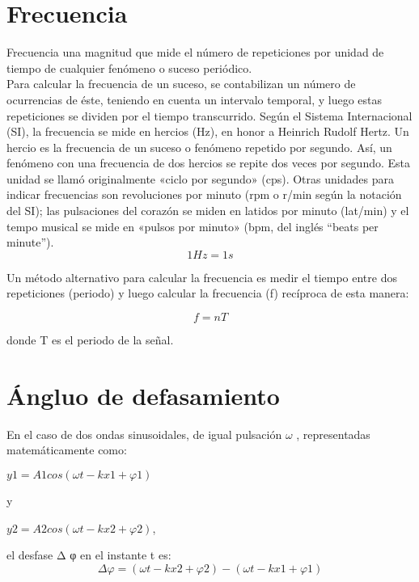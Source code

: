 \documentclass{article}
\begin{document}
\section{Frecuencia}

Frecuencia una magnitud que mide el número de repeticiones por unidad de tiempo de cualquier fenómeno o suceso periódico.\citep{Frec}\\

Para calcular la frecuencia de un suceso, se contabilizan un número de ocurrencias de éste, teniendo en cuenta un intervalo temporal, y luego estas repeticiones se dividen por el tiempo transcurrido. Según el Sistema Internacional (SI), la frecuencia se mide en hercios (Hz), en honor a Heinrich Rudolf Hertz. Un hercio es la frecuencia de un suceso o fenómeno repetido por segundo. Así, un fenómeno con una frecuencia de dos hercios se repite dos veces por segundo. Esta unidad se llamó originalmente «ciclo por segundo» (cps).
Otras unidades para indicar frecuencias son revoluciones por minuto (rpm o r/min según la notación del SI); las pulsaciones del corazón se miden en latidos por minuto (lat/min) y el tempo musical se mide en «pulsos por minuto» (bpm, del inglés “beats per minute”).\citep{Frec}\\


\begin{equation}
      1 H z = 1 s
\end{equation}
   

Un método alternativo para calcular la frecuencia es medir el tiempo entre dos repeticiones (periodo) y luego calcular la frecuencia (f) recíproca de esta manera:\citep{Frec}

\begin{equation}
     f = n T 
\end{equation}

   
donde T es el periodo de la señal.\citep{Frec}

\section{Ángluo de defasamiento}

En el caso de dos ondas sinusoidales, de igual pulsación $\omega$ , representadas matemáticamente como:

    $y 1 = A 1 cos ⁡ ( ω t − k x 1 + φ 1 ) $

y

    $y 2 = A 2 cos ⁡ ( ω t − k x 2 + φ 2 ) $,

el desfase Δ φ  en el instante t es:
\begin{equation}
   Δ φ = ( ω t − k x 2 + φ 2 ) − ( ω t − k x 1 + φ 1 )    
\end{equation}
   
\end{document}
